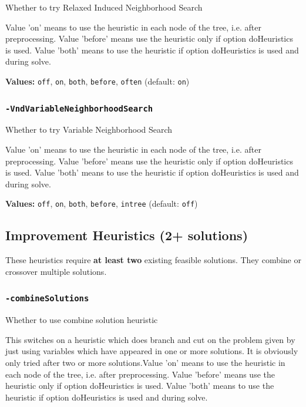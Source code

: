 \documentclass[11pt,a4paper]{article}
\begin{document}
Whether to try Relaxed Induced Neighborhood Search

Value 'on' means to use the heuristic in each node of the tree, i.e. after preprocessing. Value 'before' means use the heuristic only if option doHeuristics is used. Value 'both' means to use the heuristic if option doHeuristics is used and during solve.

\textbf{Values:} \texttt{off}, \texttt{on}, \texttt{both}, \texttt{before}, \texttt{often} (default: \texttt{on})

\subsubsection*{\texttt{-VndVariableNeighborhoodSearch}}

Whether to try Variable Neighborhood Search

Value 'on' means to use the heuristic in each node of the tree, i.e. after preprocessing. Value 'before' means use the heuristic only if option doHeuristics is used. Value 'both' means to use the heuristic if option doHeuristics is used and during solve.

\textbf{Values:} \texttt{off}, \texttt{on}, \texttt{both}, \texttt{before}, \texttt{intree} (default: \texttt{off})

\subsection{Improvement Heuristics (2+ solutions)}

These heuristics require \textbf{at least two} existing feasible solutions. They combine or crossover multiple solutions.

\subsubsection*{\texttt{-combineSolutions}}

Whether to use combine solution heuristic

This switches on a heuristic which does branch and cut on the problem given by just using variables which have appeared in one or more solutions. It is obviously only tried after two or more solutions.Value 'on' means to use the heuristic in each node of the tree, i.e. after preprocessing. Value 'before' means use the heuristic only if option doHeuristics is used. Value 'both' means to use the heuristic if option doHeuristics is used and during solve.
\end{document}
